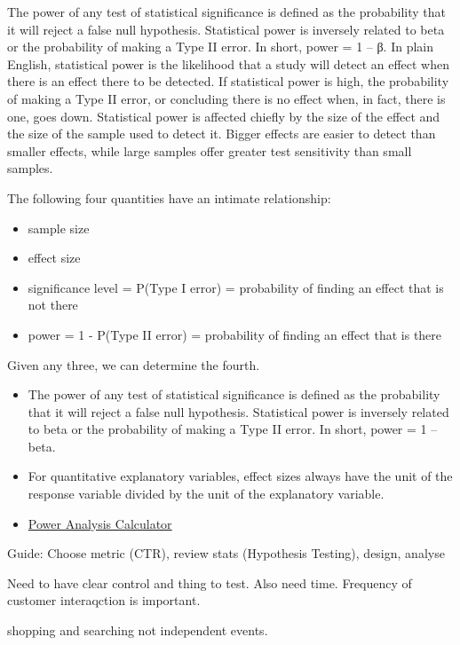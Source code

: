 \documentclass[]{book}
\begin{document}
The power of any test of statistical significance is defined as the probability that it will reject a false null hypothesis. Statistical power is inversely related to beta or the probability of making a Type II error. In short, power = 1 -- β. In plain English, statistical power is the likelihood that a study will detect an effect when there is an effect there to be detected. If statistical power is high, the probability of making a Type II error, or concluding there is no effect when, in fact, there is one, goes down. Statistical power is affected chiefly by the size of the effect and the size of the sample used to detect it. Bigger effects are easier to detect than smaller effects, while large samples offer greater test sensitivity than small samples.

The following four quantities have an intimate relationship:

\begin{itemize}
\item
  sample size
\item
  effect size
\item
  significance level = P(Type I error) = probability of finding an effect that is not there
\item
  power = 1 - P(Type II error) = probability of finding an effect that is there
\end{itemize}

Given any three, we can determine the fourth.

\begin{itemize}
\item
  The power of any test of statistical significance is defined as the probability that it will reject a false null hypothesis. Statistical power is inversely related to beta or the probability of making a Type II error. In short, power = 1 -- beta.
\item
  For quantitative explanatory variables, effect sizes always have the unit of the response variable divided by the unit of the explanatory variable.
\item
  \href{http://www.evanmiller.org/ab-testing/sample-size.html}{Power Analysis Calculator}
\end{itemize}

Guide: Choose metric (CTR), review stats (Hypothesis Testing), design, analyse

Need to have clear control and thing to test. Also need time. Frequency of customer interaqction is important.

shopping and searching not independent events.
\end{document}

